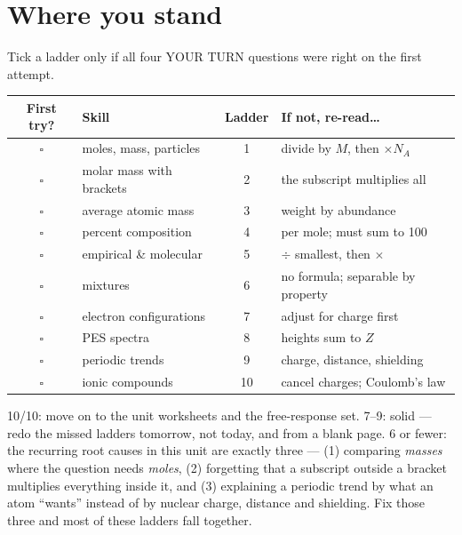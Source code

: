 \documentclass{apchem-worksheet}
\begin{document}
\section*{\sffamily Where you stand}

Tick a ladder only if all four YOUR TURN questions were right on the first
attempt.

\renewcommand{\arraystretch}{1.35}
\noindent\begin{tabular}{@{}c p{6.2cm} c >{\raggedright\arraybackslash}p{4.8cm}@{}}
\toprule
\textbf{First try?} & \textbf{Skill} & \textbf{Ladder} &
  \textbf{If not, re-read\ldots}\\
\midrule
$\square$ & moles, mass, particles & 1 & divide by $M$, then $\times N_A$ \\
$\square$ & molar mass with brackets & 2 & the subscript multiplies all \\
$\square$ & average atomic mass & 3 & weight by abundance \\
$\square$ & percent composition & 4 & per mole; must sum to 100 \\
$\square$ & empirical \& molecular & 5 & $\div$ smallest, then $\times$ \\
$\square$ & mixtures & 6 & no formula; separable by property \\
$\square$ & electron configurations & 7 & adjust for charge first \\
$\square$ & PES spectra & 8 & heights sum to $Z$ \\
$\square$ & periodic trends & 9 & charge, distance, shielding \\
$\square$ & ionic compounds & 10 & cancel charges; Coulomb's law \\
\bottomrule
\end{tabular}

\begin{apcnote}
10/10: move on to the unit worksheets and the free-response set.
7--9: solid --- redo the missed ladders tomorrow, not today, and from a
blank page. 6 or fewer: the recurring root causes in this unit are exactly
three --- (1) comparing \emph{masses} where the question needs
\emph{moles}, (2) forgetting that a subscript outside a bracket multiplies
everything inside it, and (3) explaining a periodic trend by what an atom
``wants'' instead of by nuclear charge, distance and shielding. Fix those
three and most of these ladders fall together.
\end{apcnote}
\end{document}
